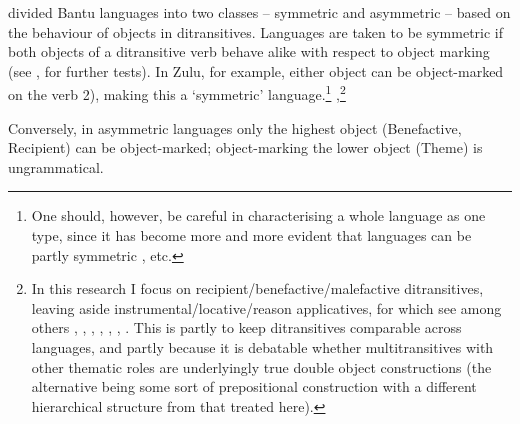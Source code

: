 \documentclass[output=paper
,modfonts
,nonflat]{langsci/langscibook}
\begin{document}
\citet{Bresnan_Moshi1990} divided Bantu languages into two classes – symmetric and asymmetric – based on the behaviour of objects in ditransitives. Languages are taken to be symmetric if both objects of a ditransitive verb behave alike with respect to object marking (see \citealt{Ngonyani1996}, \citealt{Buell2005} for further tests). In Zulu, for example, either object can be object-marked on the verb 2), making this a ‘symmetric’ language.\footnote{One should, however, be careful in characterising a whole language as one type, since it has become more and more evident that languages can be partly symmetric \citep{Schadeberg1995, Rugemalira1991, Thwala2006, Ngonyani1996, Ngonyani_Githinji2006, Riedel2009, Baker1988, Alsina_Mchombo1993, Simango1995, Zeller_Ngoboka2006, Jerro2015, Jerro2016, Van_der_Wal, 2017a}, etc.}
{,}\footnote{In this research I focus on recipient/benefactive/malefactive ditransitives, leaving aside instrumental/locative/reason applicatives, for which see among others \citet{Kimenyi1980}, \citet{Baker1988}, \citet{Ngonyani1998}, \citet{Moshi1998}, \citet{Alsina_Mchombo1993}, \citet{Ngonyani_Githinji2006}, \citet{Jerro2016}. This is partly to keep ditransitives comparable across languages, and partly because it is debatable whether multitransitives with other thematic roles are underlyingly true double object constructions (the alternative being some sort of prepositional construction with a different hierarchical structure from that treated here).}

Conversely, in asymmetric languages only the highest object (Benefactive, Recipient) can be object-marked; object-marking the lower object (Theme) is ungrammatical.
\end{document}
